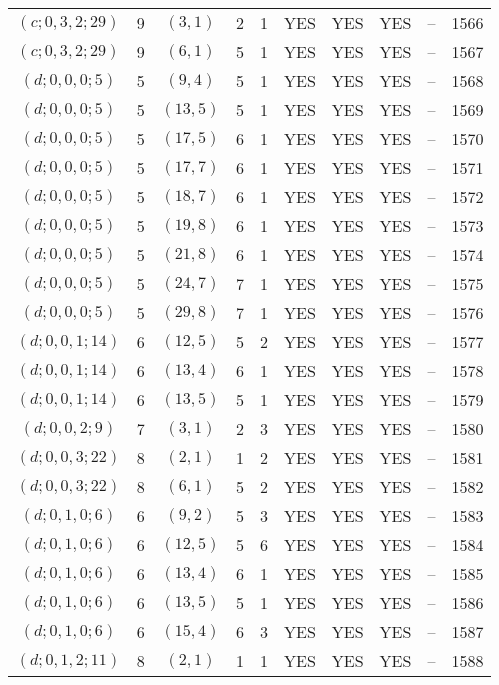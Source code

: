 \begin{longtable}{|c|c|c|c|c|c|c|c|c|c|}
$(c; 0, 3, 2; 29)$ & 9 & $(3, 1)$ & 2 & 1 & YES & YES & YES & -- & 1566\\
$(c; 0, 3, 2; 29)$ & 9 & $(6, 1)$ & 5 & 1 & YES & YES & YES & -- & 1567\\
$(d; 0, 0, 0; 5)$ & 5 & $(9, 4)$ & 5 & 1 & YES & YES & YES & -- & 1568\\
$(d; 0, 0, 0; 5)$ & 5 & $(13, 5)$ & 5 & 1 & YES & YES & YES & -- & 1569\\
$(d; 0, 0, 0; 5)$ & 5 & $(17, 5)$ & 6 & 1 & YES & YES & YES & -- & 1570\\
$(d; 0, 0, 0; 5)$ & 5 & $(17, 7)$ & 6 & 1 & YES & YES & YES & -- & 1571\\
$(d; 0, 0, 0; 5)$ & 5 & $(18, 7)$ & 6 & 1 & YES & YES & YES & -- & 1572\\
$(d; 0, 0, 0; 5)$ & 5 & $(19, 8)$ & 6 & 1 & YES & YES & YES & -- & 1573\\
$(d; 0, 0, 0; 5)$ & 5 & $(21, 8)$ & 6 & 1 & YES & YES & YES & -- & 1574\\
$(d; 0, 0, 0; 5)$ & 5 & $(24, 7)$ & 7 & 1 & YES & YES & YES & -- & 1575\\
$(d; 0, 0, 0; 5)$ & 5 & $(29, 8)$ & 7 & 1 & YES & YES & YES & -- & 1576\\
$(d; 0, 0, 1; 14)$ & 6 & $(12, 5)$ & 5 & 2 & YES & YES & YES & -- & 1577\\
$(d; 0, 0, 1; 14)$ & 6 & $(13, 4)$ & 6 & 1 & YES & YES & YES & -- & 1578\\
$(d; 0, 0, 1; 14)$ & 6 & $(13, 5)$ & 5 & 1 & YES & YES & YES & -- & 1579\\
$(d; 0, 0, 2; 9)$ & 7 & $(3, 1)$ & 2 & 3 & YES & YES & YES & -- & 1580\\
$(d; 0, 0, 3; 22)$ & 8 & $(2, 1)$ & 1 & 2 & YES & YES & YES & -- & 1581\\
$(d; 0, 0, 3; 22)$ & 8 & $(6, 1)$ & 5 & 2 & YES & YES & YES & -- & 1582\\
$(d; 0, 1, 0; 6)$ & 6 & $(9, 2)$ & 5 & 3 & YES & YES & YES & -- & 1583\\
$(d; 0, 1, 0; 6)$ & 6 & $(12, 5)$ & 5 & 6 & YES & YES & YES & -- & 1584\\
$(d; 0, 1, 0; 6)$ & 6 & $(13, 4)$ & 6 & 1 & YES & YES & YES & -- & 1585\\
$(d; 0, 1, 0; 6)$ & 6 & $(13, 5)$ & 5 & 1 & YES & YES & YES & -- & 1586\\
$(d; 0, 1, 0; 6)$ & 6 & $(15, 4)$ & 6 & 3 & YES & YES & YES & -- & 1587\\
$(d; 0, 1, 2; 11)$ & 8 & $(2, 1)$ & 1 & 1 & YES & YES & YES & -- & 1588\\

\end{longtable}
